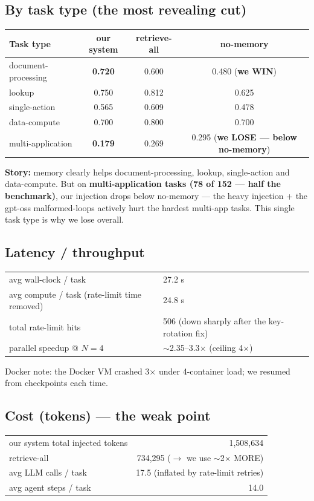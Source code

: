 \documentclass[11pt]{article}
\begin{document}
\subsection{By task type (the most revealing cut)}
\begin{center}
\begin{tabular}{@{}lccc@{}}
\toprule
Task type & our system & retrieve-all & no-memory \\
\midrule
document-processing & \textbf{0.720} & 0.600 & 0.480 \quad(\textbf{we WIN}) \\
lookup              & 0.750 & 0.812 & 0.625 \\
single-action       & 0.565 & 0.609 & 0.478 \\
data-compute        & 0.700 & 0.800 & 0.700 \\
multi-application    & \textbf{0.179} & 0.269 & 0.295 \quad(\textbf{we LOSE --- below no-memory}) \\
\bottomrule
\end{tabular}
\end{center}
\textbf{Story:} memory clearly helps document-processing, lookup, single-action and data-compute. But on
\textbf{multi-application tasks (78 of 152 --- half the benchmark)}, our injection drops below no-memory ---
the heavy injection + the gpt-oss malformed-loops actively hurt the hardest multi-app tasks. This single
task type is why we lose overall.

\subsection{Latency / throughput}
\begin{center}
\begin{tabular}{@{}ll@{}}
\toprule
avg wall-clock / task & 27.2 s \\
avg compute / task (rate-limit time removed) & 24.8 s \\
total rate-limit hits & 506 (down sharply after the key-rotation fix) \\
parallel speedup @ $N{=}4$ & $\sim$2.35--3.3$\times$ (ceiling 4$\times$) \\
\bottomrule
\end{tabular}
\end{center}
Docker note: the Docker VM crashed 3$\times$ under 4-container load; we resumed from checkpoints each time.

\subsection{Cost (tokens) --- the weak point}
\begin{center}
\begin{tabular}{@{}lr@{}}
\toprule
our system total injected tokens & 1{,}508{,}634 \\
retrieve-all & 734{,}295 \quad($\to$ we use $\sim$2$\times$ MORE) \\
avg LLM calls / task & 17.5 (inflated by rate-limit retries) \\
avg agent steps / task & 14.0 \\
\bottomrule
\end{tabular}
\end{center}
\end{document}
